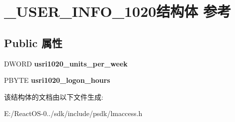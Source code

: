 \hypertarget{struct___u_s_e_r___i_n_f_o__1020}{}\section{\+\_\+\+U\+S\+E\+R\+\_\+\+I\+N\+F\+O\+\_\+1020结构体 参考}
\label{struct___u_s_e_r___i_n_f_o__1020}
\subsection*{Public 属性}
\begin{DoxyCompactItemize}
\item 
\mbox{\label{struct___u_s_e_r___i_n_f_o__1020_aa3f9b3199900d73549bf499a94b956cf}} 
D\+W\+O\+RD {\bfseries usri1020\+\_\+units\+\_\+per\+\_\+week}
\item 
\mbox{\label{struct___u_s_e_r___i_n_f_o__1020_a060cfe78d35f9c304b0a51ef409dbaf9}} 
P\+B\+Y\+TE {\bfseries usri1020\+\_\+logon\+\_\+hours}
\end{DoxyCompactItemize}


该结构体的文档由以下文件生成\+:\begin{DoxyCompactItemize}
\item 
E\+:/\+React\+O\+S-\/0../sdk/include/psdk/lmaccess.\+h\end{DoxyCompactItemize}
